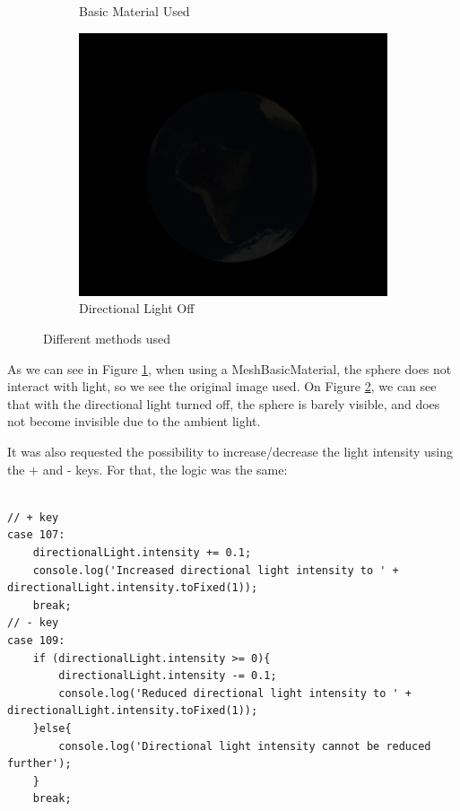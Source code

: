 \documentclass[12pt]{article}
\begin{document}
\begin{figure}[!h]
\begin{subfigure}{.5\textwidth}
        \caption{Basic Material Used}
        \label{fig:ex_35_material}
    \end{subfigure}
    \begin{subfigure}{.5\textwidth}
        \centering
        \includegraphics[width = \textwidth]{figs/ex_35_light.png}
        \caption{Directional Light Off}
        \label{fig:ex_35_light}
    \end{subfigure}
\caption{Different methods used}
\label{fig:ex_35}
\end{figure}

As we can see in Figure \ref{fig:ex_35_material}, when using a MeshBasicMaterial, the sphere does not interact with light, so we see the original image used. On Figure \ref{fig:ex_35_light}, we can see that with the directional light turned off, the sphere is barely visible, and does not become invisible due to the ambient light.

It was also requested the possibility to increase/decrease the light intensity using the + and - keys. For that, the logic was the same:
\begin{lstlisting}

// + key
case 107:
    directionalLight.intensity += 0.1;
    console.log('Increased directional light intensity to ' + directionalLight.intensity.toFixed(1));
    break;
// - key
case 109:
    if (directionalLight.intensity >= 0){
        directionalLight.intensity -= 0.1;
        console.log('Reduced directional light intensity to ' + directionalLight.intensity.toFixed(1));
    }else{
        console.log('Directional light intensity cannot be reduced further');
    }
    break;

\end{lstlisting}
\end{document}
